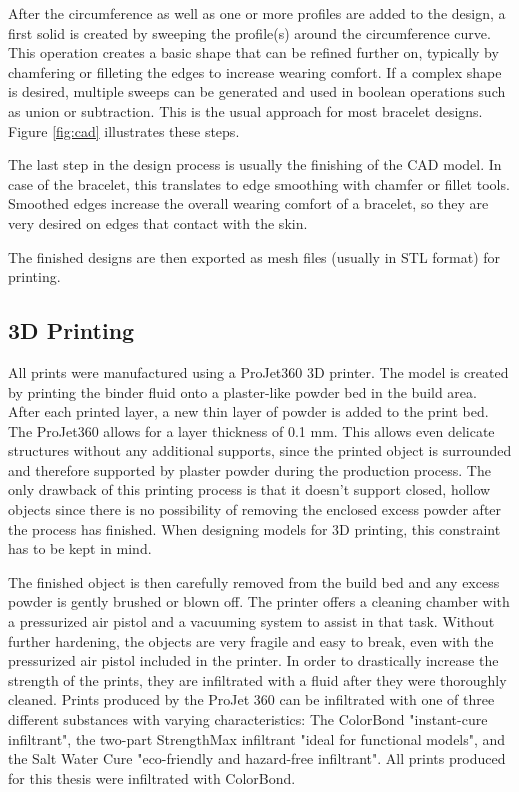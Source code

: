 After the circumference as well as one or more profiles are added to the design, a first solid is created by sweeping the profile(s) around the circumference curve. This operation creates a basic shape that can be refined further on, typically by chamfering or filleting the edges to increase wearing comfort. If a complex shape is desired, multiple sweeps can be generated and used in boolean operations such as union or subtraction. This is the usual approach for most bracelet designs. Figure \ref{fig:cad} illustrates these steps.

The last step in the design process is usually the finishing of the \ac{CAD} model. In case of the bracelet, this translates to edge smoothing with chamfer or fillet tools. Smoothed edges increase the overall wearing comfort of a bracelet, so they are very desired on edges that contact with the skin.

The finished designs are then exported as mesh files (usually in \ac{STL} format) for printing.

\subsection{3D Printing}
All prints were manufactured using a ProJet360 3D printer\cite{printer}. The model is created by printing the binder fluid onto a plaster-like powder bed in the build area. After each printed layer, a new thin layer of powder is added to the print bed. The ProJet360 allows for a layer thickness of 0.1 mm\cite{datasheet_printer}. This allows even delicate structures without any additional supports, since the printed object is surrounded and therefore supported by plaster powder during the production process. The only drawback of this printing process is that it doesn't support closed, hollow objects since there is no possibility of removing the enclosed excess powder after the process has finished. When designing models for 3D printing, this constraint has to be kept in mind.

The finished object is then carefully removed from the build bed and any excess powder is gently brushed or blown off. The printer offers a cleaning chamber with a pressurized air pistol and a vacuuming system to assist in that task. Without further hardening, the objects are very fragile and easy to break, even with the pressurized air pistol included in the printer. In order to drastically increase the strength of the prints, they are infiltrated with a fluid after they were thoroughly cleaned. Prints produced by the ProJet 360 can be infiltrated with one of three different substances with varying characteristics: The ColorBond "instant-cure infiltrant", the two-part StrengthMax infiltrant "ideal for functional models", and the Salt Water Cure "eco-friendly and hazard-free infiltrant"\cite{datasheet_printer}. All prints produced for this thesis were infiltrated with ColorBond.

